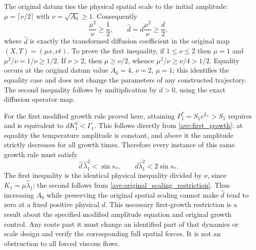 The original datum ties the physical spatial scale to the initial
amplitude: $\mu=\lceil\nu/2\rceil$ with $\nu=\sqrt{A_0}\geq1$.
Consequently
\begin{equation}\label{ave:original_scaling_restriction}
 \frac{\mu^2}{\nu}\geq\frac12,
 \qquad \widehat d=d\frac{\mu^2}{\nu}\geq\frac d2,
\end{equation}
where $\widehat d$ is exactly the transformed diffusion coefficient
in the original map $(X,T)=(\mu x,\nu t)$.
To prove the first inequality, if $1\leq\nu\leq2$ then $\mu=1$
and $\mu^2/\nu=1/\nu\geq1/2$. If $\nu>2$, then
$\mu\geq\nu/2$, whence $\mu^2/\nu\geq\nu/4>1/2$.
Equality occurs at the original datum value $A_0=4$, $\nu=2$, $\mu=1$;
this identifies the equality case and does not change the parameters
of any constructed trajectory. The second inequality follows by
multiplication by $d>0$, using the exact diffusion operator map.

For the first modified growth rule proved here, attaining
$P_1^*=S_1e^{L_1}>S_1$ requires and is equivalent to
$dK_1^2<\Gamma_1$. This follows directly from
\eqref{ave:first_growth}: at equality the temperature amplitude is
constant, and above it the amplitude strictly decreases for all growth
times. Therefore every instance of this same growth rule must satisfy
\begin{equation}\label{ave:necessary_first_growth}
 \widehat d\,\widehat\lambda_1^2<\sin s_*,\qquad
 d\widehat\lambda_1^2<2\sin s_*.
\end{equation}
The first inequality is the identical physical inequality divided by
$\nu$, since $K_1=\mu\widehat\lambda_1$; the second follows from
\eqref{ave:original_scaling_restriction}.
Thus increasing $A_0$ while preserving the original spatial scaling
cannot make $\widehat d$ tend to zero at a fixed positive physical $d$.
This necessary first-growth restriction is a result about the specified
modified amplitude equation and original growth control. Any route
past it must change an identified part of that dynamics or scale
design and verify the corresponding full spatial forces. It is not
an obstruction to all forced viscous flows.
